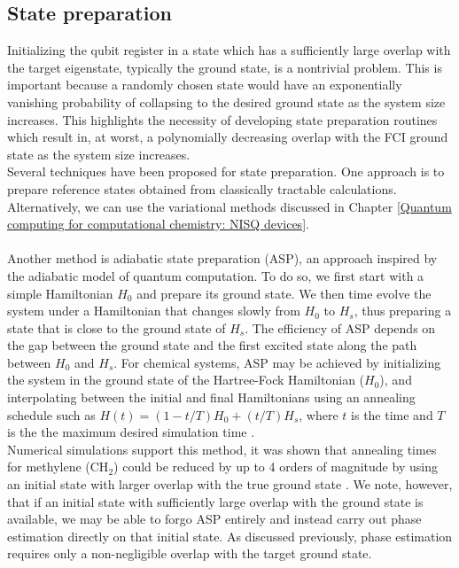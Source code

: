 \subsection{State preparation}
Initializing the qubit register in a state which has a sufficiently large overlap with the target eigenstate, typically the ground state, is a nontrivial problem. This is important because a randomly chosen state would have an exponentially vanishing probability of collapsing to the desired ground state as the system size increases. This highlights the necessity of developing state preparation routines which result in, at worst, a polynomially decreasing overlap with the FCI ground state as the system size increases. \\
Several techniques have been proposed for state preparation. One approach is to prepare reference states obtained from classically tractable calculations. Alternatively, we can use the variational methods discussed in Chapter \ref{Quantum computing for computational chemistry: NISQ devices}. \\
\\
Another method is adiabatic state preparation (ASP), an approach inspired by the adiabatic model of quantum computation. To do so, we first start with a simple Hamiltonian $H_0$ and prepare its ground state. We then time evolve the system under a Hamiltonian that changes slowly from $H_0$ to $H_s$, thus preparing a state that is close to the ground state of $H_s$. The efficiency of ASP  depends on the gap between the ground state and the first excited state along the path between $H_0$ and $H_s$. For chemical systems, ASP may be achieved by initializing the system in the ground state of the Hartree-Fock Hamiltonian ($H_0$), and interpolating between the initial and final Hamiltonians using an annealing schedule such as $H(t) = (1-t/T)H_0 + (t/T)H_s$, where $t$ is the time and $T$ is the the maximum desired simulation time \cite{McArdle2020Mar}. \\
Numerical simulations support this method, it was shown that annealing times for methylene (CH$_2$) could be reduced by up to 4 orders of magnitude by using an initial state with larger overlap with the true ground state \cite{Veis2014Jun}. We note, however, that if an initial state with sufficiently large overlap with the ground state is available, we may be able to forgo ASP entirely and instead carry out phase estimation directly on that initial state. As discussed previously, phase estimation requires only a non-negligible overlap with the target ground state.

